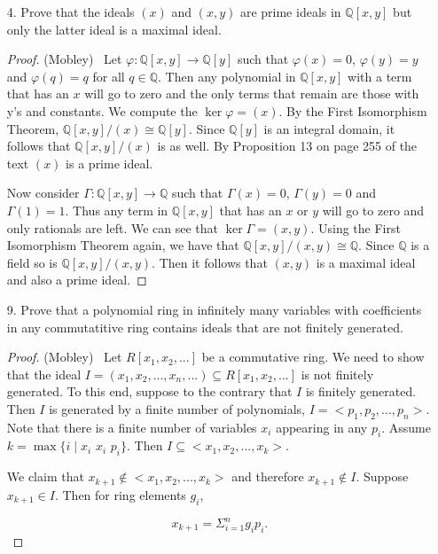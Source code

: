 \documentclass[10pt]{article}
\newcommand{\Q}{\mathbb{Q}}
\renewcommand{\phi}{\varphi}
\begin{document}
\begin{itemize}

\item[4.]  Prove that the ideals $(x)$ and $(x,y)$ are prime ideals in $\Q[x,y]$ but only the latter ideal is a maximal ideal.

\begin{proof}(Mobley) \ Let $\phi : \Q [x,y] \rightarrow \Q[y]$ such that
$\phi(x)=0$, $\phi(y)=y$ and $\phi(q)=q$ for all $q \in \Q$.  Then
any polynomial in $\Q[x,y]$ with a term that has an $x$ will go to
zero and the only terms that remain are those with y's and
constants.  We compute the $\ker \phi = (x)$.  By the First
Isomorphism Theorem, $\Q [x,y]/(x) \cong \Q[y]$.  Since $\Q[y]$ is
an integral domain, it follows that $\Q [x,y]/(x)$ is as well.  By
Proposition 13 on page 255 of the text $(x)$ is a prime ideal.

Now consider $\Gamma : \Q [x,y]\rightarrow \Q$ such that
$\Gamma(x)=0$, $\Gamma(y)=0$ and $\Gamma(1)=1$.  Thus any term in
$\Q[x,y]$ that has an $x$ or $y$ will go to zero and only rationals
are left.  We can see that $\ker\Gamma = (x,y)$.  Using the First
Isomorphism Theorem again, we have that $\Q [x,y]/(x,y) \cong \Q$.
Since $\Q$ is a field so is $\Q [x,y]/(x,y)$.  Then it follows that
$(x,y)$ is a maximal ideal and also a prime ideal.

\end{proof}

\item[9.]  Prove that a polynomial ring in infinitely many variables with coefficients in any commutatitive ring contains ideals that are not finitely generated.


\begin{proof}(Mobley) \ Let $R[x_1, x_2, ...]$ be a commutative ring.
We need to show that the ideal $I=(x_1, x_2, ... , x_n,...)\subseteq
R[x_1, x_2, ...]$ is not finitely generated.  To this end, suppose
to the contrary that $I$ is finitely generated.  Then $I$ is
generated by a finite number of polynomials, $I=<p_1, p_2, ...
,p_n>$.  Note that there is a finite number of variables $x_i$
appearing in any $p_i$.  Assume $k=\max \lbrace i \mid x_i$  $x_i$  $p_i\rbrace$.  Then
$I\subseteq <x_1, x_2, ... ,x_k>$.

We claim that $x_{k+1}\notin<x_1, x_2, ... ,x_k>$ and therefore
$x_{k+1}\notin I$.  Suppose $x_{k+1}\in I$.  Then for ring elements
$g_i$,

$$x_{k+1}=\Sigma_{i=1}^{n} g_ip_i.$$


\end{proof}
\end{itemize}
\end{document}
